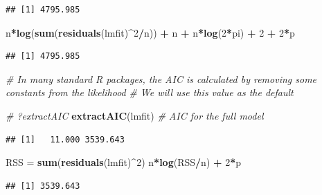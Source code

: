 \documentclass[
]{book}
\newenvironment{Shaded}{\begin{snugshade}}{\end{snugshade}}
\newcommand{\CommentTok}[1]{\textcolor[rgb]{0.56,0.35,0.01}{\textit{#1}}}
\newcommand{\DecValTok}[1]{\textcolor[rgb]{0.00,0.00,0.81}{#1}}
\newcommand{\KeywordTok}[1]{\textcolor[rgb]{0.13,0.29,0.53}{\textbf{#1}}}
\newcommand{\NormalTok}[1]{#1}
\newcommand{\OperatorTok}[1]{\textcolor[rgb]{0.81,0.36,0.00}{\textbf{#1}}}
\newcommand{\StringTok}[1]{\textcolor[rgb]{0.31,0.60,0.02}{#1}}
\begin{document}
\begin{verbatim}
## [1] 4795.985
\end{verbatim}

\begin{Shaded}
\begin{Highlighting}[]
\NormalTok{    n}\OperatorTok{*}\KeywordTok{log}\NormalTok{(}\KeywordTok{sum}\NormalTok{(}\KeywordTok{residuals}\NormalTok{(lmfit)}\OperatorTok{^}\DecValTok{2}\OperatorTok{/}\NormalTok{n)) }\OperatorTok{+}\StringTok{ }\NormalTok{n }\OperatorTok{+}\StringTok{ }\NormalTok{n}\OperatorTok{*}\KeywordTok{log}\NormalTok{(}\DecValTok{2}\OperatorTok{*}\NormalTok{pi) }\OperatorTok{+}\StringTok{ }\DecValTok{2} \OperatorTok{+}\StringTok{ }\DecValTok{2}\OperatorTok{*}\NormalTok{p}
\end{Highlighting}
\end{Shaded}

\begin{verbatim}
## [1] 4795.985
\end{verbatim}

\begin{Shaded}
\begin{Highlighting}[]
    \CommentTok{# In many standard R packages, the AIC is calculated by removing some constants from the likelihood }
    \CommentTok{# We will use this value as the default}
    
    \CommentTok{# ?extractAIC}
    \KeywordTok{extractAIC}\NormalTok{(lmfit) }\CommentTok{# AIC for the full model}
\end{Highlighting}
\end{Shaded}

\begin{verbatim}
## [1]   11.000 3539.643
\end{verbatim}

\begin{Shaded}
\begin{Highlighting}[]
\NormalTok{    RSS =}\StringTok{ }\KeywordTok{sum}\NormalTok{(}\KeywordTok{residuals}\NormalTok{(lmfit)}\OperatorTok{^}\DecValTok{2}\NormalTok{)}
\NormalTok{    n}\OperatorTok{*}\KeywordTok{log}\NormalTok{(RSS}\OperatorTok{/}\NormalTok{n) }\OperatorTok{+}\StringTok{ }\DecValTok{2}\OperatorTok{*}\NormalTok{p}
\end{Highlighting}
\end{Shaded}

\begin{verbatim}
## [1] 3539.643
\end{verbatim}
\end{document}
